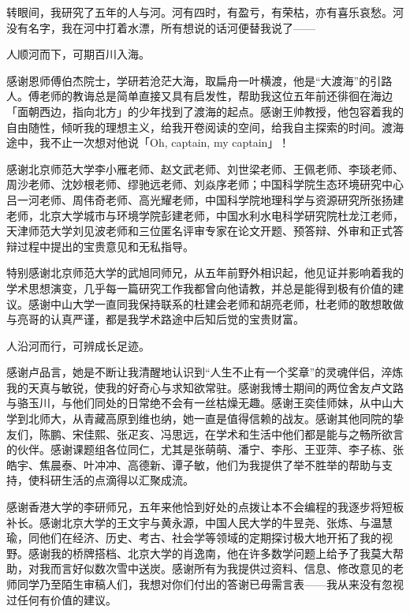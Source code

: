 

\begin{ack}

    转眼间，我研究了五年的人与河。河有四时，有盈亏，有荣枯，亦有喜乐哀愁。河没有名字，我在河中打着水漂，所有想说的话河便替我说了——

    人顺河而下，可期百川入海。
    
    感谢恩师傅伯杰院士，学研若沧茫大海，取扁舟一叶横渡，他是“大渡海”的引路人。傅老师的教诲总是简单直接又具有启发性，帮助我这位五年前还徘徊在海边「面朝西边，指向北方」的少年找到了渡海的起点。感谢王帅教授，他包容着我的自由随性，倾听我的理想主义，给我开卷阅读的空间，给我自主探索的时间。渡海途中，我不止一次想对他说「Oh, captain, my captain」！
    
    感谢北京师范大学李小雁老师、赵文武老师、刘世梁老师、王佩老师、李琰老师、周沙老师、沈妙根老师、缪驰远老师、刘焱序老师；中国科学院生态环境研究中心吕一河老师、周伟奇老师、高光耀老师，中国科学院地理科学与资源研究所张扬建老师，北京大学城市与环境学院彭建老师，中国水利水电科学研究院杜龙江老师，天津师范大学刘见波老师和三位匿名评审专家在论文开题、预答辩、外审和正式答辩过程中提出的宝贵意见和无私指导。

    特别感谢北京师范大学的武旭同师兄，从五年前野外相识起，他见证并影响着我的学术思想演变，几乎每一篇研究工作我都曾向他请教，并总是能得到极有价值的建议。感谢中山大学一直同我保持联系的杜建会老师和胡亮老师，杜老师的敢想敢做与亮哥的认真严谨，都是我学术路途中后知后觉的宝贵财富。
    
    人沿河而行，可辨成长足迹。
    
    感谢卢品言，她是不断让我清醒地认识到“人生不止有一个奖章”的灵魂伴侣，淬炼我的天真与敏锐，使我的好奇心与求知欲常驻。感谢我博士期间的两位舍友卢文路与骆玉川，与他们同处的日常绝不会有一丝枯燥无趣。感谢王奕佳师妹，从中山大学到北师大，从青藏高原到维也纳，她一直是值得信赖的战友。感谢其他同院的挚友们，陈鹏、宋佳熙、张疋亥、冯思远，在学术和生活中他们都是能与之畅所欲言的伙伴。感谢课题组各位同仁，尤其是张萌萌、潘宁、李彤、王亚萍、李子栋、张皓宇、焦晨泰、叶冲冲、高德新、谭子敏，他们为我提供了举不胜举的帮助与支持，使科研生活的点滴得以汇聚成流。
    
    感谢香港大学的李研师兄，五年来他恰到好处的点拨让本不会编程的我逐步将短板补长。感谢北京大学的王文宇与黄永源，中国人民大学的牛昱尧、张炼、与温慧瑜，同他们在经济、历史、考古、社会学等领域的定期探讨极大地开拓了我的视野。感谢我的桥牌搭档、北京大学的肖逸南，他在许多数学问题上给予了我莫大帮助，对我而言好似数次雪中送炭。感谢所有为我提供过资料、信息、修改意见的老师同学乃至陌生审稿人们，我想对你们付出的答谢已毋需言表——我从来没有忽视过任何有价值的建议。
    

\end{ack}
